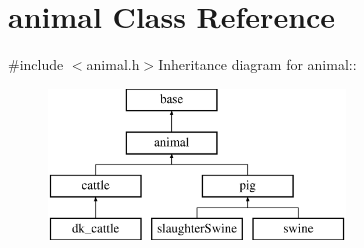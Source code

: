\hypertarget{classanimal}{
\section{animal Class Reference}
\label{classanimal}
}


{\ttfamily \#include $<$animal.h$>$}Inheritance diagram for animal::\begin{figure}[H]
\begin{center}
\leavevmode
\includegraphics[height=4cm]{classanimal}
\end{center}
\end{figure}

